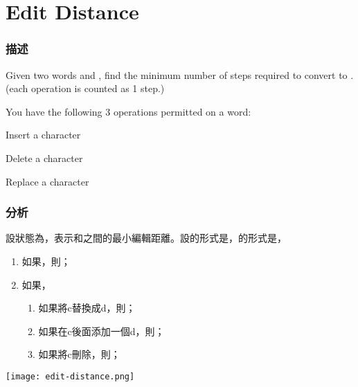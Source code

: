\section{Edit Distance} %
\label{sec:edit-distance}


\subsubsection{描述}
Given two words  and , find the minimum number of steps required to convert  to . (each operation is counted as 1 step.)

You have the following 3 operations permitted on a word:
\begindot
\item Insert a character
\item Delete a character
\item Replace a character
\myenddot


\subsubsection{分析}
設狀態為，表示和之間的最小編輯距離。設的形式是，的形式是，
\begin{enumerate}
\item 如果，則；
\item 如果，
    \begin{enumerate}
        \item 如果將c替換成d，則；
        \item 如果在c後面添加一個d，則；
        \item 如果將c刪除，則；
    \end{enumerate}
\end{enumerate}


\begin{center}
\texttt{[image: edit-distance.png]}\\
\label{fig:edit-distance}
\end{center}

